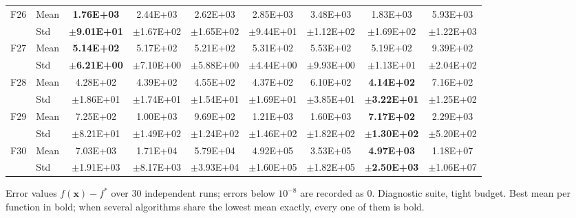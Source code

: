 \begin{table}[htbp]
{\begin{tabular}{clccccccc}
F26 & Mean & \textbf{1.76E+03} & 2.44E+03 & 2.62E+03 & 2.85E+03 & 3.48E+03 & 1.83E+03 & 5.93E+03 \\
 & Std & $\pm$\textbf{9.01E+01} & $\pm$1.67E+02 & $\pm$1.65E+02 & $\pm$9.44E+01 & $\pm$1.12E+02 & $\pm$1.69E+02 & $\pm$1.22E+03 \\
F27 & Mean & \textbf{5.14E+02} & 5.17E+02 & 5.21E+02 & 5.31E+02 & 5.53E+02 & 5.19E+02 & 9.39E+02 \\
 & Std & $\pm$\textbf{6.21E+00} & $\pm$7.10E+00 & $\pm$5.88E+00 & $\pm$4.44E+00 & $\pm$9.93E+00 & $\pm$1.13E+01 & $\pm$2.04E+02 \\
F28 & Mean & 4.28E+02 & 4.39E+02 & 4.55E+02 & 4.37E+02 & 6.10E+02 & \textbf{4.14E+02} & 7.16E+02 \\
 & Std & $\pm$1.86E+01 & $\pm$1.74E+01 & $\pm$1.54E+01 & $\pm$1.69E+01 & $\pm$3.85E+01 & $\pm$\textbf{3.22E+01} & $\pm$1.25E+02 \\
F29 & Mean & 7.25E+02 & 1.00E+03 & 9.69E+02 & 1.21E+03 & 1.60E+03 & \textbf{7.17E+02} & 2.29E+03 \\
 & Std & $\pm$8.21E+01 & $\pm$1.49E+02 & $\pm$1.24E+02 & $\pm$1.46E+02 & $\pm$1.82E+02 & $\pm$\textbf{1.30E+02} & $\pm$5.20E+02 \\
F30 & Mean & 7.03E+03 & 1.71E+04 & 5.79E+04 & 4.92E+05 & 3.53E+05 & \textbf{4.97E+03} & 1.18E+07 \\
 & Std & $\pm$1.91E+03 & $\pm$8.17E+03 & $\pm$3.93E+04 & $\pm$1.60E+05 & $\pm$1.82E+05 & $\pm$\textbf{2.50E+03} & $\pm$1.06E+07 \\
\bottomrule
\end{tabular}}
\begin{flushleft}\footnotesize
Error values $f(\mathbf{x})-f^{*}$ over 30 independent runs; errors below $10^{-8}$ are recorded as 0. Diagnostic suite, tight budget. Best mean per function in bold; when several algorithms share the lowest mean exactly, every one of them is bold.
\end{flushleft}
\end{table}
